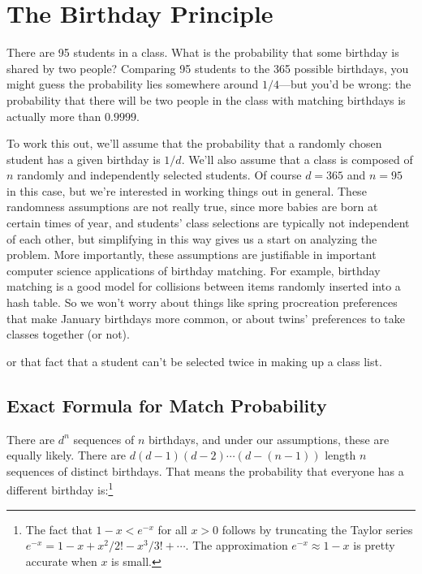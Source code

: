 \section{The Birthday Principle}\label{birthday_principle_sec}

There are 95 students in a class.  What is the probability that some
birthday is shared by two people?  Comparing 95 students to the 365
possible birthdays, you might guess the probability lies somewhere
around $1/4$---but you'd be wrong: the probability that there will be
two people in the class with matching birthdays is actually more than
$0.9999$.

To work this out, we'll assume that the probability that a randomly
chosen student has a given birthday is $1/d$.  We'll also assume that
a class is composed of $n$ randomly and independently selected
students.  Of course $d= 365$ and $n=95$ in this case, but we're
interested in working things out in general.  These randomness
assumptions are not really true, since more babies are born at certain
times of year, and students' class selections are typically not
independent of each other, but simplifying in this way gives us a
start on analyzing the problem.  More importantly, these assumptions
are justifiable in important computer science applications of birthday
matching.  For example, birthday matching is a good model for
collisions between items randomly inserted into a hash table.  So we
won't worry about things like spring procreation preferences that make
January birthdays more common, or about twins' preferences to take
classes together (or not).  \begin{editingnotes} or that fact that a
  student can't be selected twice in making up a class list.
\end{editingnotes}

\subsection{Exact Formula for Match Probability}
\iffalse The matching birthday problem fits in here so far as a nice
example illustrating pairwise and mutual independence, but t's
actually not hard to justify the bound~\eqref{bday-approx} without any
pretence of independence.
\fi

There are $d^n$ sequences of $n$ birthdays, and under our assumptions,
these are equally likely.  There are $d (d - 1) (d - 2) \cdots (d - (n
- 1))$ length $n$ sequences of distinct birthdays.  That means the
probability that everyone has a different birthday is:\footnote{The
  fact that $1-x < e^{-x}$ for all $x>0$ follows by truncating the Taylor
  series $e^{-x} = 1 - x + x^2/2!  - x^3/3! + \cdots$.  The
  approximation $e^{-x} \approx 1 - x$ is pretty accurate when $x$ is
  small.}

